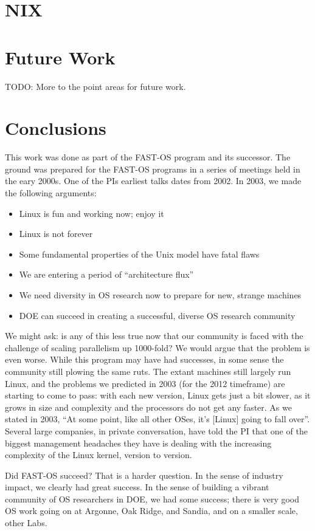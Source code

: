 \documentclass{report}
\begin{document}
\chapter{NIX}

\chapter{Future Work}
TODO: More to the point areas for
future work.
\chapter{Conclusions}

This work was done as part of the FAST-OS program and its successor. 
The ground was prepared for the FAST-OS programs in a series of meetings held in
the eary 2000s. One of the PIs earliest talks dates from 2002. In 2003, we made
the following arguments: 
\begin{itemize}
\item Linux is fun and working now; enjoy it
\item Linux is not forever
\item Some fundamental properties of the Unix model have fatal flaws
\item We are entering a period of “architecture flux” 
\item We need diversity in OS research now to prepare for new, strange machines
\item DOE can succeed in creating a successful, diverse OS research community
\end{itemize}

We might ask: is any of this less true now that our community is faced with 
the challenge of scaling parallelism up 1000-fold? We would argue that 
the problem is even worse. While this program may have had successes, in some 
sense the community
still plowing the same ruts. The extant machines still largely run Linux, and the 
problems we predicted in 2003 (for the 2012 timeframe) are starting to 
come to pass: with each new version, Linux gets just a bit slower, as it grows in size 
and complexity and the processors do not get any faster. As we stated in 2003, 
``At some point, like all other OSes, it’s [Linux] going to fall over''. 
Several large companies, in private conversation, have told the PI that one of the
biggest management headaches they have is dealing with the increasing complexity of 
the Linux kernel, version to version. 

Did FAST-OS succeed? That is a harder question. In the sense of industry impact, we 
clearly had great success. In the sense of building a vibrant community of OS researchers
in DOE, we had some success; there is very good OS work going on at Argonne, Oak Ridge, 
and Sandia, and on a smaller scale, other Labs. 
\end{document}
